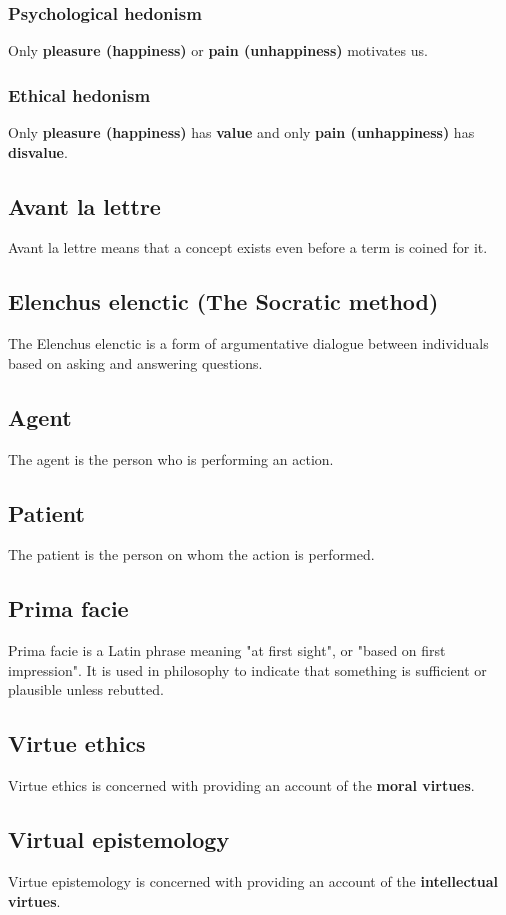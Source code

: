 \documentclass[11pt]{article}
\begin{document}
\subsubsection{Psychological hedonism}
\label{sec:org65034cf}
Only \textbf{pleasure (happiness)} or \textbf{pain (unhappiness)} motivates us.
\subsubsection{Ethical hedonism}
\label{sec:org1867171}
Only \textbf{pleasure (happiness)} has \textbf{value} and only \textbf{pain (unhappiness)} has \textbf{disvalue}.
\subsection{Avant la lettre}
\label{sec:org57fa4a4}
Avant la lettre means that a concept exists even before a term is coined for it.
\subsection{Elenchus elenctic (The Socratic method)}
\label{sec:orgc346543}
The Elenchus elenctic is a form of argumentative dialogue between individuals based on asking and answering questions.
\subsection{Agent}
\label{sec:org06f8168}
The agent is the person who is performing an action.
\subsection{Patient}
\label{sec:org5b8000c}
The patient is the person on whom the action is performed.
\subsection{Prima facie}
\label{sec:orgc35498c}
Prima facie is a Latin phrase meaning "at first sight", or "based on first impression". It is used in philosophy to indicate that something is sufficient or plausible unless rebutted.
\subsection{Virtue ethics}
\label{sec:orgf817b3f}
Virtue ethics is concerned with providing an account of the \textbf{moral virtues}.
\subsection{Virtual epistemology}
\label{sec:org95975f6}
Virtue epistemology is concerned with providing an account of the \textbf{intellectual virtues}.
\end{document}
